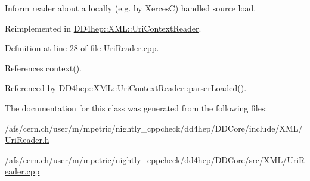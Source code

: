 Inform reader about a locally (e.g. by XercesC) handled source load. 

Reimplemented in \hyperlink{class_d_d4hep_1_1_x_m_l_1_1_uri_context_reader_ae3ec9a7f4f18adf4dcac1d894453dbd0}{DD4hep::XML::UriContextReader}.

Definition at line 28 of file UriReader.cpp.

References context().

Referenced by DD4hep::XML::UriContextReader::parserLoaded().

The documentation for this class was generated from the following files:\begin{DoxyCompactItemize}
\item 
/afs/cern.ch/user/m/mpetric/nightly\_\-cppcheck/dd4hep/DDCore/include/XML/\hyperlink{_uri_reader_8h}{UriReader.h}\item 
/afs/cern.ch/user/m/mpetric/nightly\_\-cppcheck/dd4hep/DDCore/src/XML/\hyperlink{_uri_reader_8cpp}{UriReader.cpp}\end{DoxyCompactItemize}
